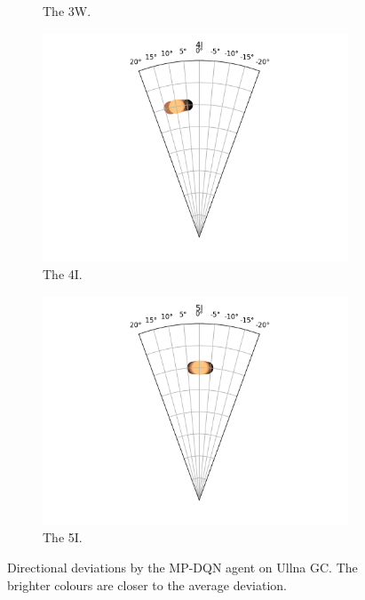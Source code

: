 \documentclass{kththesis}
\begin{document}
\begin{figure}
\begin{subfigure}{0.4\textwidth}
    \caption{The 3W.}
    \label{fig:3W_ullna_deviation}
    \end{subfigure}
    \begin{subfigure}{0.4\textwidth}
    \centering
    \includegraphics[width=\textwidth]{AgentDirectionChoices/MPDQN_Ullna_Direction_Choices_4I.png} 
    \caption{The 4I.}
    \label{fig:4I_ullna_deviation}
    \end{subfigure}
    \begin{subfigure}{0.4\textwidth}
    \centering
    \includegraphics[width=\textwidth]{AgentDirectionChoices/MPDQN_Ullna_Direction_Choices_5I.png} 
    \caption{The 5I.}
    \label{fig:5I_ullna_deviation}
    \end{subfigure}
    \caption{Directional deviations by the MP-DQN agent on Ullna GC. The brighter colours are closer to the average deviation.}
\end{figure}
\end{document}
